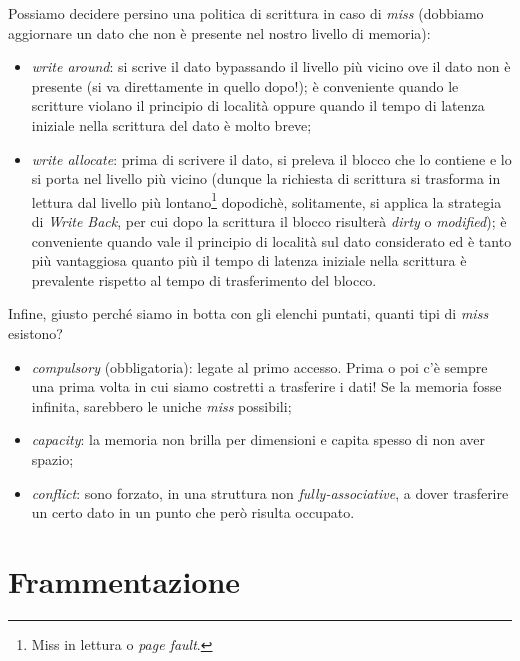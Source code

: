 Possiamo decidere persino una politica di scrittura in caso di \textit{miss} (dobbiamo aggiornare un dato che non è presente nel nostro livello di memoria):
\begin{itemize}
\item \textit{write around}: si scrive il dato bypassando il livello più vicino ove il dato non
è presente (si va direttamente in quello dopo!); è conveniente quando le scritture violano il principio di località oppure quando il tempo di latenza iniziale nella scrittura del dato è molto breve;
\item \textit{write allocate}: prima di scrivere il dato, si preleva il blocco che lo contiene e lo si porta nel livello più vicino (dunque la richiesta di scrittura si trasforma in lettura dal livello più lontano\footnote{Miss in lettura o \textit{page fault}.} dopodichè, solitamente, si applica la strategia di \textit{Write Back}, per cui dopo la scrittura il blocco risulterà \textit{dirty} o \textit{modified}); è conveniente quando vale il principio di località sul dato considerato ed è tanto più vantaggiosa quanto più il tempo di latenza iniziale nella scrittura è prevalente rispetto al tempo di trasferimento del blocco. 
\end{itemize}

Infine, giusto perché siamo in botta con gli elenchi puntati, quanti tipi di \textit{miss} esistono?
\begin{itemize}
\item \textit{compulsory} (obbligatoria): legate al primo accesso. Prima o poi c'è sempre una prima volta in cui siamo costretti a trasferire i dati! Se la memoria fosse infinita, sarebbero le uniche \textit{miss} possibili;
\item \textit{capacity}: la memoria non brilla per dimensioni e capita spesso di non aver spazio;
\item \textit{conflict}: sono forzato, in una struttura non \textit{fully-associative}, a dover trasferire un certo dato in un punto che però risulta occupato.
\end{itemize}


\section{Frammentazione}
\label{sec:frammentazione}

